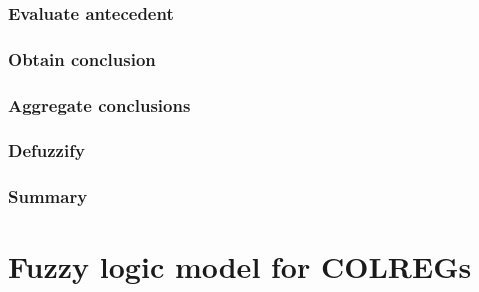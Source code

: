 \subsubsection{Evaluate antecedent}
\subsubsection{Obtain conclusion}
\subsubsection{Aggregate conclusions}
\subsubsection{Defuzzify}
\subsubsection{Summary}
\section{Fuzzy logic model for COLREGs}